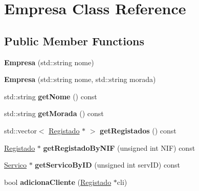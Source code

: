 \hypertarget{class_empresa}{}\section{Empresa Class Reference}
\label{class_empresa}
\subsection*{Public Member Functions}
\begin{DoxyCompactItemize}
\item 
\hypertarget{class_empresa_a246d93027070baa8adfd65d16aa4199d}{}\label{class_empresa_a246d93027070baa8adfd65d16aa4199d} 
{\bfseries Empresa} (std\+::string nome)
\item 
\hypertarget{class_empresa_a84deac5a4a2151c58759f89167a45124}{}\label{class_empresa_a84deac5a4a2151c58759f89167a45124} 
{\bfseries Empresa} (std\+::string nome, std\+::string morada)
\item 
\hypertarget{class_empresa_ae917f6b8a8be9316e1dd553b2ccb6332}{}\label{class_empresa_ae917f6b8a8be9316e1dd553b2ccb6332} 
std\+::string {\bfseries get\+Nome} () const
\item 
\hypertarget{class_empresa_a4ba5753ee333e062a47615b0a2c442c2}{}\label{class_empresa_a4ba5753ee333e062a47615b0a2c442c2} 
std\+::string {\bfseries get\+Morada} () const
\item 
\hypertarget{class_empresa_a7625bb6835dec408801b92e0f6ae89bb}{}\label{class_empresa_a7625bb6835dec408801b92e0f6ae89bb} 
std\+::vector$<$ \hyperlink{class_registado}{Registado} $\ast$ $>$ {\bfseries get\+Registados} () const
\item 
\hypertarget{class_empresa_a35b2ad7ce666b30d99edd10c691b335a}{}\label{class_empresa_a35b2ad7ce666b30d99edd10c691b335a} 
\hyperlink{class_registado}{Registado} $\ast$ {\bfseries get\+Registado\+By\+N\+IF} (unsigned int N\+IF) const
\item 
\hypertarget{class_empresa_a6057325975eae633f66ba2504ac8dd09}{}\label{class_empresa_a6057325975eae633f66ba2504ac8dd09} 
\hyperlink{class_servico}{Servico} $\ast$ {\bfseries get\+Servico\+By\+ID} (unsigned int serv\+ID) const
\item 
\hypertarget{class_empresa_ae9df2a1a1d8bf2ac64d08a88a13f0c5f}{}\label{class_empresa_ae9df2a1a1d8bf2ac64d08a88a13f0c5f} 
bool {\bfseries adiciona\+Cliente} (\hyperlink{class_registado}{Registado} $\ast$cli)
\item 
\hypertarget{class_empresa_aec387d18fb6dc010738c5d878cff1645}{}\label{class_empresa_aec387d18fb6dc010738c5d878cff1645} 

\end{DoxyCompactItemize}
